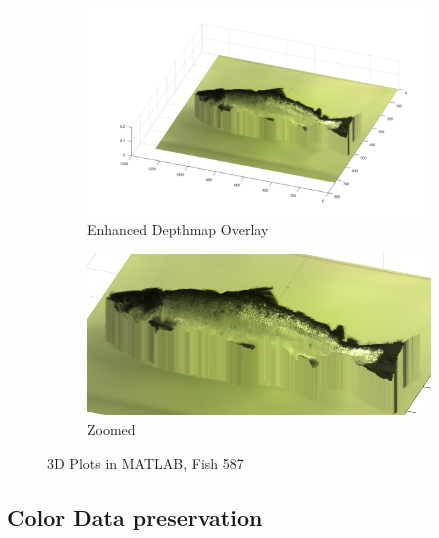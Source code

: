 \begin{figure}[H]
    \medskip
    \begin{subfigure}{0.41\textwidth}
        \includegraphics[width=\linewidth]{images/results/3D_plots/fixed_3D_fish_87}
        \caption{Enhanced Depthmap Overlay}
    \end{subfigure}\hspace*{\fill}
    \begin{subfigure}{0.57\textwidth}
        \includegraphics[width=\linewidth]{images/results/3D_plots/zoomed_fixed_3D_fish_87}
        \caption{Zoomed}
    \end{subfigure}
    
    \caption{3D Plots in MATLAB, Fish 587} 
    \label{fig:3D_plot_87}
\end{figure}
\newpage




\subsection{Color Data preservation}

